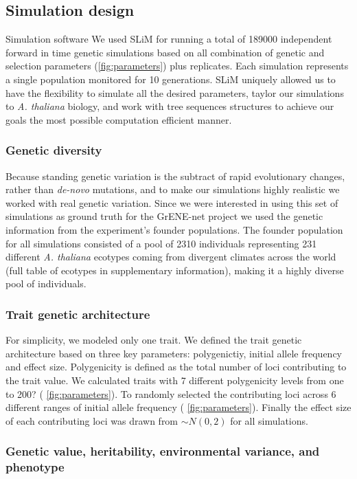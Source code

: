 \documentclass{article}
\begin{document}
\subsection{Simulation design}

Simulation software
We used SLiM \citep{Haller2019-oj} for running a total of 189000 independent forward in time genetic simulations based on all combination of genetic and selection parameters (\ref{fig:parameters}) plus replicates. Each simulation represents a single population monitored for 10 generations. SLiM uniquely allowed us to have the flexibility to simulate all the desired parameters, taylor our simulations to \textit{A. thaliana} biology, and work with tree sequences structures to achieve our goals the most possible computation efficient manner.

\subsubsection{Genetic diversity}
Because standing genetic variation is the subtract of rapid evolutionary changes, rather than \textit{de-novo} mutations, and to make our simulations highly realistic we worked with real genetic variation. Since we were interested in using this set of simulations as ground truth for the GrENE-net project we used the genetic information from the experiment's founder populations. The founder population for all simulations consisted of a pool of 2310 individuals representing 231 different \textit{A. thaliana} ecotypes coming from divergent climates across the world (full table of ecotypes in supplementary information), making it a highly diverse pool of individuals. 

\subsubsection{Trait genetic architecture}
For simplicity, we modeled only one trait. We defined the trait genetic architecture based on three key parameters: polygenictiy, initial allele frequency and effect size. Polygenicity is defined as the total number of loci contributing to the trait value. We calculated traits with 7 different polygenicity levels from one to 200? ( \ref{fig:parameters}). To randomly selected the contributing loci across 6 different ranges of initial allele frequency ( \ref{fig:parameters}). Finally the effect size of each contributing loci was drawn from \( \sim N(0, 2) \) for all simulations.

\subsubsection{Genetic value, heritability, environmental variance, and phenotype}
\end{document}
